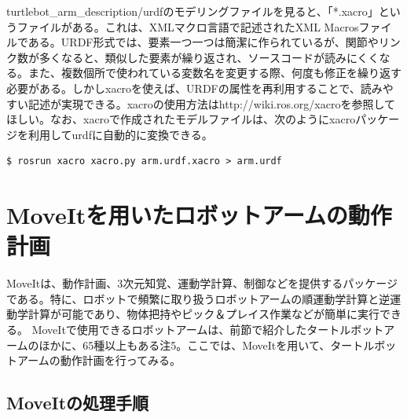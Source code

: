 \begin{exercise}[Xacroファイル]
turtlebot\_arm\_description/urdfのモデリングファイルを見ると、「*.xacro」というファイルがある。これは、XMLマクロ言語で記述されたXML Macrosファイルである。URDF形式では、要素一つ一つは簡潔に作られているが、関節やリンク数が多くなると、類似した要素が繰り返され、ソースコードが読みにくくなる。また、複数個所で使われている変数名を変更する際、何度も修正を繰り返す必要がある。しかしxacroを使えば、URDFの属性を再利用することで、読みやすい記述が実現できる。xacroの使用方法はhttp://wiki.ros.org/xacroを参照してほしい。なお、xacroで作成されたモデルファイルは、次のようにxacroパッケージを利用してurdfに自動的に変換できる。

\begin{lstlisting}[language=ROS]
$ rosrun xacro xacro.py arm.urdf.xacro > arm.urdf
\end{lstlisting}
\end{exercise}

\section{MoveItを用いたロボットアームの動作計画}

MoveItは、動作計画、3次元知覚、運動学計算、制御などを提供するパッケージである。特に、ロボットで頻繁に取り扱うロボットアームの順運動学計算と逆運動学計算が可能であり、物体把持やピック＆プレイス作業などが簡単に実行できる。
MoveItで使用できるロボットアームは、前節で紹介したタートルボットアームのほかに、65種以上もある注5。ここでは、MoveItを用いて、タートルボットアームの動作計画を行ってみる。

\subsection{MoveItの処理手順}

